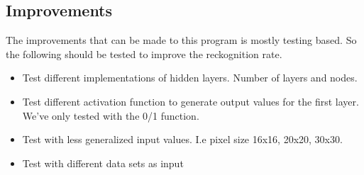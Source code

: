 \subsection{Improvements}
The improvements that can be made to this program is mostly testing based. So
the following should be tested to improve the reckognition rate.
\begin{itemize}
\item Test different implementations of hidden layers. Number of layers and
	nodes.
\item Test different activation function to generate output values for the first
	layer.  We've only tested with the 0/1 function.
\item Test with less generalized input values. I.e pixel size 16x16, 20x20,
	30x30.
\item Test with different data sets as input
\end{itemize}

